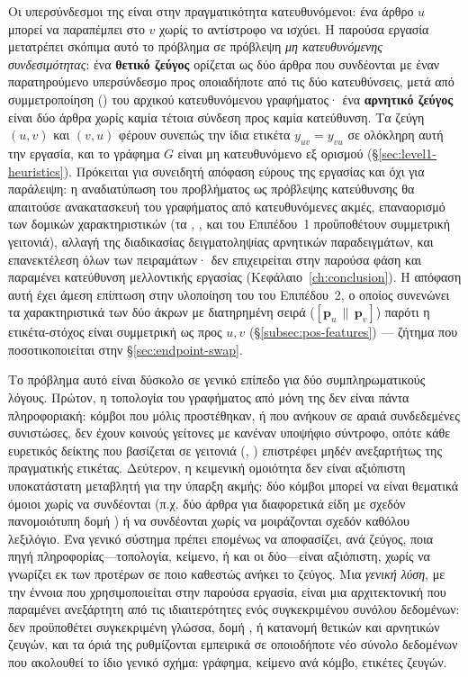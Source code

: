 Οι υπερσύνδεσμοι της  είναι στην πραγματικότητα κατευθυνόμενοι: ένα
άρθρο $u$ μπορεί να παραπέμπει στο $v$ χωρίς το αντίστροφο να ισχύει.
Η παρούσα
εργασία μετατρέπει σκόπιμα αυτό το πρόβλημα σε πρόβλεψη \textit{μη κατευθυνόμενης
συνδεσιμότητας}: ένα \textbf{θετικό ζεύγος} ορίζεται ως δύο άρθρα που συνδέονται
με έναν παρατηρούμενο υπερσύνδεσμο προς οποιαδήποτε από τις δύο κατευθύνσεις,
μετά από συμμετροποίηση () του αρχικού κατευθυνόμενου γραφήματος·
ένα \textbf{αρνητικό ζεύγος} είναι δύο άρθρα χωρίς καμία τέτοια σύνδεση προς καμία
κατεύθυνση.
Τα ζεύγη $(u, v)$ και $(v, u)$ φέρουν συνεπώς την ίδια ετικέτα
$y_{uv} = y_{vu}$ σε ολόκληρη αυτή την εργασία, και το γράφημα $G$ είναι μη
κατευθυνόμενο εξ ορισμού (\S\ref{sec:level1-heuristics}).
Πρόκειται για συνειδητή
απόφαση εύρους της εργασίας και όχι για παράλειψη: η αναδιατύπωση του προβλήματος
ως πρόβλεψης κατεύθυνσης θα απαιτούσε ανακατασκευή του γραφήματος από
κατευθυνόμενες ακμές, επαναορισμό των δομικών χαρακτηριστικών (τα , ,  και  του
Επιπέδου~1 προϋποθέτουν συμμετρική γειτονιά), αλλαγή της διαδικασίας
δειγματοληψίας αρνητικών παραδειγμάτων, και επανεκτέλεση όλων των πειραμάτων· δεν
επιχειρείται στην παρούσα φάση και παραμένει κατεύθυνση μελλοντικής εργασίας
(Κεφάλαιο~\ref{ch:conclusion}). Η απόφαση αυτή έχει άμεση επίπτωση στην υλοποίηση
του  του Επιπέδου~2, ο οποίος συνενώνει τα χαρακτηριστικά των
δύο άκρων με διατηρημένη σειρά ($[\mathbf{p}_u \,\|\, \mathbf{p}_v]$) παρότι η
ετικέτα-στόχος είναι συμμετρική ως προς $u, v$ (\S\ref{subsec:pos-features}) —
ζήτημα που ποσοτικοποιείται στην
\S\ref{sec:endpoint-swap}.

Το πρόβλημα αυτό είναι δύσκολο σε γενικό επίπεδο για δύο συμπληρωματικούς λόγους.
Πρώτον, η τοπολογία του γραφήματος από μόνη της δεν είναι πάντα πληροφοριακή: κόμβοι
που μόλις προστέθηκαν, ή που ανήκουν σε αραιά συνδεδεμένες συνιστώσες, δεν έχουν
κοινούς γείτονες με κανέναν υποψήφιο σύντροφο, οπότε κάθε ευρετικός δείκτης που
βασίζεται σε γειτονιά (, ) επιστρέφει μηδέν
ανεξαρτήτως της πραγματικής ετικέτας.
Δεύτερον, η κειμενική ομοιότητα δεν είναι
αξιόπιστη υποκατάστατη μεταβλητή για την ύπαρξη ακμής: δύο κόμβοι μπορεί να είναι
θεματικά όμοιοι χωρίς να συνδέονται (π.χ. δύο άρθρα για διαφορετικά είδη με σχεδόν
πανομοιότυπη δομή ) ή να συνδέονται χωρίς να μοιράζονται σχεδόν καθόλου
λεξιλόγιο.
Ένα γενικό σύστημα πρέπει επομένως να αποφασίζει, ανά ζεύγος, ποια πηγή
πληροφορίας---τοπολογία, κείμενο, ή και οι δύο---είναι αξιόπιστη, χωρίς να γνωρίζει
εκ των προτέρων σε ποιο καθεστώς ανήκει το ζεύγος.
Μια \textit{γενική λύση}, με την
έννοια που χρησιμοποιείται στην παρούσα εργασία, είναι μια αρχιτεκτονική που
παραμένει ανεξάρτητη από τις ιδιαιτερότητες ενός συγκεκριμένου συνόλου δεδομένων:
δεν προϋποθέτει συγκεκριμένη γλώσσα, δομή , ή κατανομή θετικών και
αρνητικών ζευγών, και τα όριά της ρυθμίζονται εμπειρικά σε οποιοδήποτε νέο σύνολο
δεδομένων που ακολουθεί το ίδιο γενικό σχήμα: γράφημα, κείμενο ανά κόμβο, ετικέτες
ζευγών.

